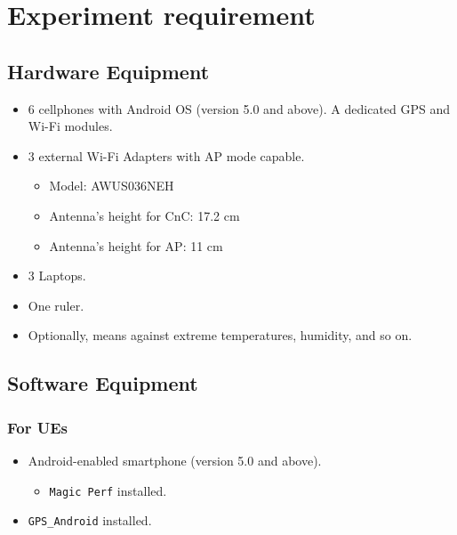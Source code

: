 \section{Experiment requirement}\label{experiment-requirement}

\subsection{Hardware Equipment}\label{hardware-equipment}

\begin{itemize}
\tightlist
\item
  6 cellphones with Android OS (version 5.0 and above). A dedicated GPS
  and Wi-Fi modules.
\item
  3 external Wi-Fi Adapters with AP mode capable.

  \begin{itemize}
  \tightlist
  \item
    Model: AWUS036NEH
  \item
    Antenna's height for CnC: 17.2 cm
  \item
    Antenna's height for AP: 11 cm
  \end{itemize}
\item
  3 Laptops.
\item
  One ruler.
\item
  Optionally, means against extreme temperatures, humidity, and so on.
\end{itemize}

\subsection{Software Equipment}\label{software-equipment}

\subsubsection{For UEs}\label{for-ues}

\begin{itemize}
\tightlist
\item
  Android-enabled smartphone (version 5.0 and above).

  \begin{itemize}
  \tightlist
  \item
    \texttt{Magic\ Perf} installed.
  \end{itemize}
\item
  \texttt{GPS\_Android} installed.
\end{itemize}

